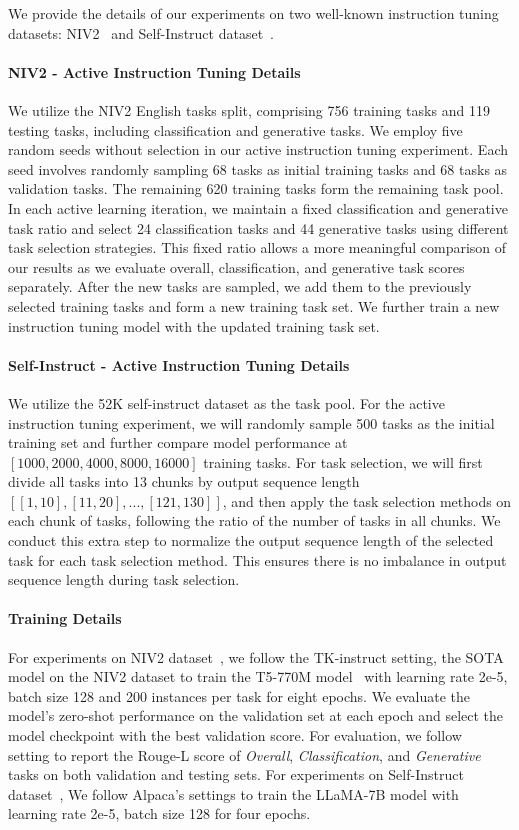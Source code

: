 We provide the details of our experiments on two well-known instruction tuning datasets: NIV2~\cite{Wang2022SuperNaturalInstructionsGV} and Self-Instruct dataset~\cite{wang2022self}. 
\paragraph{NIV2 - Active Instruction Tuning Details}
We utilize the NIV2 English tasks split, comprising 756 training tasks and 119 testing tasks, including classification and generative tasks.
We employ five random seeds without selection in our active instruction tuning experiment. Each seed involves randomly sampling 68 tasks as initial training tasks and 68 tasks as validation tasks. The remaining 620 training tasks form the remaining task pool. 
In each active learning iteration, we maintain a fixed classification and generative task ratio and select 24 classification tasks and 44 generative tasks using different task selection strategies. This fixed ratio allows a more meaningful comparison of our results as we evaluate overall, classification, and generative task scores separately. After the new tasks are sampled, we add them to the previously selected training tasks and form a new training task set. We further train a new instruction tuning model with the updated training task set.
\paragraph{Self-Instruct - Active Instruction Tuning Details}
We utilize the 52K self-instruct dataset as the task pool. For the active instruction tuning experiment, we will randomly sample 500 tasks as the initial training set and further compare model performance at $[1000, 2000, 4000, 8000, 16000]$ training tasks. For task selection, we will first divide all tasks into 13 chunks by output sequence length $[[1,10], [11,20], ..., [121, 130]]$, and then apply the task selection methods on each chunk of tasks, following the ratio of the number of tasks in all chunks. We conduct this extra step to normalize the output sequence length of the selected task for each task selection method. This ensures there is no imbalance in output sequence length during task selection.
\paragraph{Training Details}
For experiments on NIV2 dataset~\cite{Wang2022SuperNaturalInstructionsGV}, we follow the TK-instruct setting, the SOTA model on the NIV2 dataset to train the T5-770M model~\cite{raffel2020exploring} with learning rate 2e-5, batch size 128 and 200 instances per task for eight epochs. We evaluate the model's zero-shot performance on the validation set at each epoch and select the model checkpoint with the best validation score. For evaluation, we follow ~\cite{kung2023models} setting to report the Rouge-L score of \textit{Overall}, \textit{Classification}, and \textit{Generative} tasks on both validation and testing sets. For experiments on Self-Instruct dataset~\cite{wang2022self}, We follow Alpaca's settings to train the LLaMA-7B model with learning rate 2e-5, batch size 128 for four epochs.

